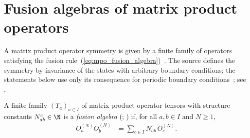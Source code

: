 \section{Fusion algebras of matrix product operators}%
\label{sec:mposym_fusion}

A matrix product operator symmetry is given by a finite family of operators
satisfying the fusion rule~(\ref{eq:mpo_fusion_algebra})~\cite{GarreRubio2023MPOSym}.
The source defines the symmetry by invariance of the states with arbitrary
boundary conditions; the statements below use only its consequence for
periodic boundary conditions~\cite[Section~3]{GarreRubio2023MPOSym}; see
\cite{gap:glm23_mpo_symmetric_mps_scope}.

\begin{definition}%
    \label{def:mpo_fusion_algebra}
    \leanok
    A finite family $(T_a)_{a\in I}$ of matrix product operator tensors with
    structure constants $N_{ab}^c\in\N$ is a \emph{fusion algebra}
    (\cite[Section~2]{GarreRubio2023MPOSym}; \cite{Bultinck2017Anyons}) if, for
    all $a,b\in I$ and $N\geq1$,
    \begin{align}
        O_a^{(N)}O_b^{(N)}
         & =\sum_{c\in I}N_{ab}^c\,O_c^{(N)}.
        \label{eq:mpo_fusion_algebra}
    \end{align}
\end{definition}

